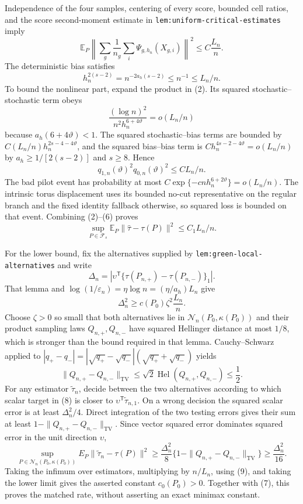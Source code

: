 Independence of the four samples, centering of every score, bounded cell ratios, and the score second-moment estimate in \texttt{lem:uniform-critical-estimates} imply
\[
 \mathbb E_P\left\|
 \sum_g\frac1{n_g}\sum_i\Psi_{g,h_n}(X_{g,i})
 \right\|^2\leq C\frac{L_n}{n}.                                     \tag{3}
\]
The deterministic bias satisfies
\[
 h_n^{2(s-2)}=n^{-2a_h(s-2)}\leq n^{-1}\leq L_n/n.                   \tag{4}
\]
To bound the nonlinear part, expand the product in (2).  Its squared stochastic--stochastic term obeys
\[
 \frac{(\log n)^2}{n^2h_n^{6+4\vartheta}}
 =o(L_n/n)                                                             \tag{5}
\]
because \(a_h(6+4\vartheta)<1\).  The squared stochastic--bias terms are bounded by
\(C(L_n/n)h_n^{2s-4-4\vartheta}\), and the squared bias--bias term is
\(Ch_n^{4s-2-4\vartheta}=o(L_n/n)\) by
\(a_h\geq1/[2(s-2)]\) and \(s\geq8\).  Hence
\[
 q_{1,n}(\vartheta)^2q_{0,n}(\vartheta)^2\leq C L_n/n.               \tag{6}
\]
The bad pilot event has probability at most
\(C\exp\{-cnh_n^{6+2\vartheta}\}=o(L_n/n)\).  The intrinsic torus displacement uses its bounded no-cut representative on the regular branch and the fixed identity fallback otherwise, so squared loss is bounded on that event.  Combining (2)--(6) proves
\[
 \sup_{P\in\mathcal F_s}
 \mathbb E_P\|\widehat\tau-\tau(P)\|^2
 \leq C_1L_n/n.                                                        \tag{7}
\]

For the lower bound, fix the alternatives supplied by \texttt{lem:green-local-alternatives} and write
\[
 \Delta_n=\left|\upsilon^{\mathsf T}
 \{\tau(P_{n,+})-\tau(P_{n,-})\}_1\right|.                           \tag{8}
\]
That lemma and
\(\log(1/\varepsilon_n)=\eta\log n=(\eta/a_h)L_n\) give
\[
 \Delta_n^2\geq c(P_0)\zeta^2\frac{L_n}{n}.                          \tag{9}
\]
Choose \(\zeta>0\) so small that both alternatives lie in
\(\mathcal N_n(P_0,\kappa(P_0))\) and their product sampling laws
\(Q_{n,+},Q_{n,-}\) have squared Hellinger distance at most \(1/8\), which is stronger than the bound required in that lemma.  Cauchy--Schwarz applied to
\(|q_+-q_-|=|\sqrt{q_+}-\sqrt{q_-}|(\sqrt{q_+}+\sqrt{q_-})\) yields
\[
 \|Q_{n,+}-Q_{n,-}\|_{\mathrm{TV}}
 \leq\sqrt2\operatorname{Hel}(Q_{n,+},Q_{n,-})\leq\frac12.           \tag{10}
\]
For any estimator \(\widetilde\tau_n\), decide between the two alternatives according to which scalar target in (8) is closer to
\(\upsilon^{\mathsf T}\widetilde\tau_{n,1}\).  On a wrong decision the squared scalar error is at least \(\Delta_n^2/4\).  Direct integration of the two testing errors gives their sum at least
\(1-\|Q_{n,+}-Q_{n,-}\|_{\mathrm{TV}}\).  Since vector squared error dominates squared error in the unit direction \(\upsilon\),
\[
 \sup_{P\in\mathcal N_n(P_0,\kappa(P_0))}
 E_P\|\widetilde\tau_n-\tau(P)\|^2
 \geq\frac{\Delta_n^2}{8}
 \{1-\|Q_{n,+}-Q_{n,-}\|_{\mathrm{TV}}\}
 \geq\frac{\Delta_n^2}{16}.                                         \tag{11}
\]
Taking the infimum over estimators, multiplying by \(n/L_n\), using (9), and taking the lower limit gives the asserted constant \(c_0(P_0)>0\).  Together with (7), this proves the matched rate, without asserting an exact minimax constant.

